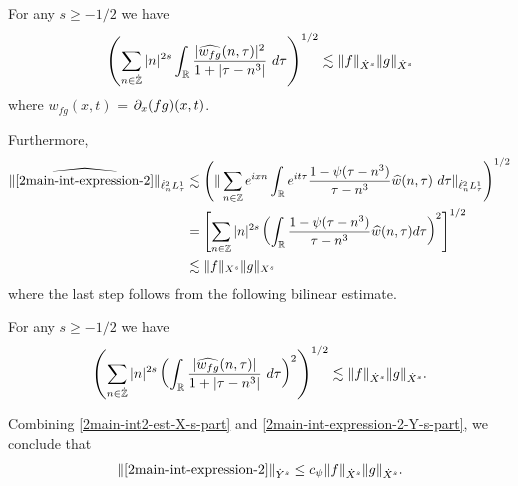 %
%
%
%
%
%
\begin{proposition}
	\label{2prop:prim-bilin-est}
	For any $s \ge -1/2$ we have
	\begin{equation}
		\label{2prim-bilin-est}
		\left( \sum_{n \in \dot{\mathbb{Z}}} |n|^{2s} \int_{\mathbb{R}}
		\frac{|\widehat{w_{fg}}(n, \tau) |^2}{1+ |\tau - 
		n^{3}| } 
		 \ d \tau 
		\right)^{1/2}
		\lesssim \|f\|_{\dot{X}^s} \|g\|_{\dot{X}^s}
	\end{equation}
	where $w_{fg}(x,t)$ = $\partial_x(fg)(x,t)$.
\end{proposition}
Furthermore,
%
%
%
%
\begin{equation}
	\label{2main-int-expression-2-Y-s-part}
	\begin{split}
		\|\wh{\eqref{2main-int-expression-2}} \|_{\dot{\ell}^2_n L^1_\tau}
		& \lesssim \left( \| \sum_{n \in \zz} e^{ixn} \int_\rr 
		e^{it \tau} \frac{1 - \psi (\tau - n^{3} ) 
		}{\tau - n^{3}} \wh{w}(n, \tau) \ 
		d \tau\|_{\dot{\ell}^2_n L^1_\tau} \right)^{1/2}
		\\
		& = \left[ \sum_{n \in \zz}|n|^{2s} \left(
		\int_{\rr}\frac{1 - \psi(\tau - n^{3})}{\tau - n^{3}} \wh{w}(n, \tau) d
		\tau \right)^{2} \right]^{1/2}
		\\
		& \lesssim \|f\|_{X^s} \|g\|_{X^s}
	\end{split}
\end{equation}
%
%
where the last step follows from the following bilinear estimate.
%
%
%
%
%
%
%
\begin{proposition}
\label{2prop:bilinear-estimate2}
For any $s \ge -1/2$ we have
%
%
\begin{equation}
	\label{2bilinear-estimate2}
	\begin{split}
		\left( \sum_{n \in \dot{\mathbb{Z}}} |n|^{2s}  \left ( \int_{\mathbb{R}} 
		\frac{|\widehat{w_{fg}}(n, \tau) |}{1 + | \tau - n^3 |}
		 \ d\tau \right)^2  \right)^{1/2} \lesssim \|f\|_{\dot{X}^s} \|g\|_{\dot{X}^s}.
	\end{split}
\end{equation}
\end{proposition}
%
%
Combining \eqref{2main-int2-est-X-s-part} and
\eqref{2main-int-expression-2-Y-s-part}, we conclude that
%
%
%
%
\begin{equation}
	\label{2main-int2-est}
	\begin{split}
		\|\eqref{2main-int-expression-2}\|_{\dot{Y}^s} \le c_{\psi}\|f\|_{\dot{X}^s} \|g\|_{\dot{X}^s}.
	\end{split}
\end{equation}
%
%

